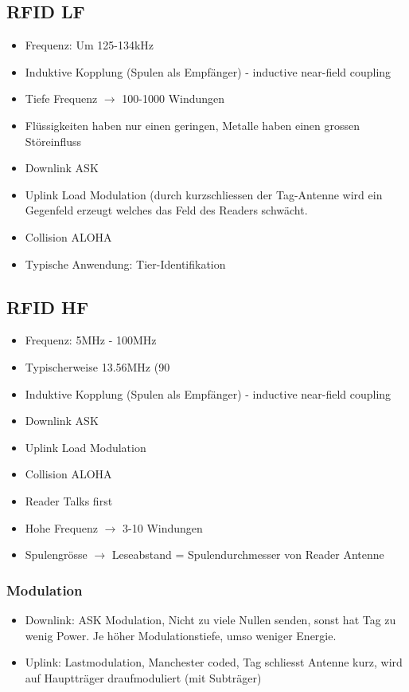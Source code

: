 \subsection{RFID LF}
	\begin{itemize}
		\item Frequenz: Um 125-134kHz
		\item Induktive Kopplung (Spulen als Empfänger) - inductive near-field coupling
		\item Tiefe Frequenz $\rightarrow$ 100-1000 Windungen
		\item Flüssigkeiten haben nur einen geringen, Metalle haben einen grossen Störeinfluss
		\item Downlink ASK
		\item Uplink Load Modulation (durch kurzschliessen der Tag-Antenne wird ein Gegenfeld erzeugt welches das Feld des Readers schwächt.
		\item Collision ALOHA
		\item Typische Anwendung: Tier-Identifikation
	\end{itemize}
	
\subsection{RFID HF}
	\begin{itemize}
		\item Frequenz: 5MHz - 100MHz
		\item Typischerweise 13.56MHz (90%
		\item Induktive Kopplung (Spulen als Empfänger) - inductive near-field coupling
		\item Downlink ASK
		\item Uplink Load Modulation
		\item Collision ALOHA
		\item Reader Talks first
		\item Hohe Frequenz $\rightarrow$ 3-10 Windungen
		\item Spulengrösse $\rightarrow$ Leseabstand = Spulendurchmesser von Reader Antenne
	\end{itemize}
\subsubsection{Modulation}
	\begin{itemize}
		\item Downlink: ASK Modulation, Nicht zu viele Nullen senden, sonst hat Tag zu wenig Power. Je höher Modulationstiefe, umso weniger Energie. 
		\item Uplink: Lastmodulation, Manchester coded, Tag schliesst Antenne kurz, wird auf Hauptträger draufmoduliert (mit Subträger)
	\end{itemize}
